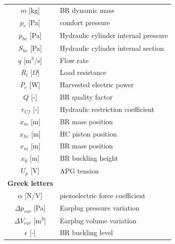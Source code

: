 \documentclass[3p,twocolumn,preprint]{elsarticle}
\begin{document}
\begin{table}
\begin{minipage}{.5\textwidth}
\end{minipage}
\begin{minipage}{.5\textwidth}
\begin{tabular}{ c  m{6cm} }
		$m$ [kg]			     & BR dynamic mass 										   \\
		$p_c$ [Pa]               & comfort pressure                                        \\
		$p_{hc}$ [Pa]            & Hydraulic cylinder internal pressure                    \\
		$S_{hc}$ [Pa]            & Hydraulic cylinder internal section                     \\
		$q$ [m$^3$/s]            & Flow rate                                               \\
		$R_l$ [$\Omega$]         & Load resistance                                         \\
		$P_e$ [W]                & Harvested electric power                                \\
		$Q$ [-]                  & BR quality factor                                       \\
		$r_{Cf}$ [-]             & Hydraulic restriction coefficient                       \\
		$x_m$ [m]                & BR mass position                                        \\
		$x_{hc}$ [m]             & HC piston position                                      \\
		$x_m$ [m]                & BR mass position                                        \\
		$x_0$ [m]                & BR buckling height                                       \\
		$U_p$ [V]                & APG tension                                             \\
		\textbf{Greek letters}   &                                                         \\
		$\alpha$ [N/V]           & piezoelectric force coefficient                         \\
		$\Delta p_{ear}$ [Pa]    & Earplug pressure variation                              \\
		$\Delta V_{ear}$ [m$^3$] & Earplug volume variation                                \\
		$\epsilon$ [-]           & BR buckling level                                       \\

\end{tabular}
\end{minipage}
\end{table}
\end{document}

